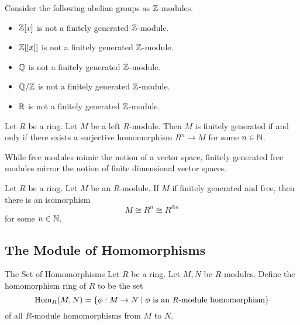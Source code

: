 \documentclass[a4paper]{article}
\begin{document}
\begin{eg}{}{} Consider the following abelian groups as $\mathbb{Z}$-modules. 
\begin{itemize}
\item $\mathbb{Z}[x]$ is not a finitely generated $\mathbb{Z}$-module. 
\item $\mathbb{Z}[[x]]$ is not a finitely generated $\mathbb{Z}$-module. 
\item $\mathbb{Q}$ is not a finitely generated $\mathbb{Z}$-module. 
\item $\mathbb{Q}/\mathbb{Z}$ is not a finitely generated $\mathbb{Z}$-module. 
\item $\mathbb{R}$ is not a finitely generated $\mathbb{Z}$-module. 
\end{itemize}
\end{eg}

\begin{prp}{}{} Let $R$ be a ring. Let $M$ be a left $R$-module. Then $M$ is finitely generated if and only if there exists a surjective homomorphism $R^n\to M$ for some $n\in\mathbb{N}$. 
\end{prp}

While free modules mimic the notion of a vector space, finitely generated free modules mirror the notion of finite dimensional vector spaces. 

\begin{prp}{}{} Let $R$ be a ring. Let $M$ be an $R$-module. If $M$ if finitely generated and free, then there is an isomorphism $$M\cong R^n\cong R^{\oplus n}$$ for some $n\in\mathbb{N}$. 
\end{prp}

\subsection{The Module of Homomorphisms}
\begin{defn}{The Set of Homomorphisms}{} Let $R$ be a ring. Let $M,N$ be $R$-modules. Define the homomorphism ring of $R$ to be the set $$\operatorname{Hom}_R(M,N)=\{\phi:M\to N\;|\;\phi\text{ is an }R\text{-module homomorphism}\}$$ of all $R$-module homomorphisms from $M$ to $N$.
\end{defn}
\end{document}
